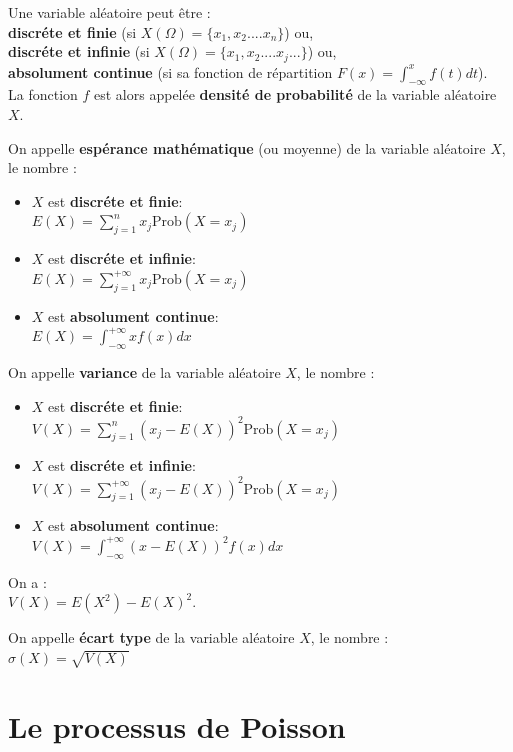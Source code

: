 \documentclass[a4paper,11pt]{book}
\begin{document}
Une variable al\'eatoire peut \^etre :\\
{\bf  discr\'ete et finie} (si $X(\Omega)=\{x_1,x_2....x_n\}$) ou,\\
{\bf  discr\'ete et infinie} (si $X(\Omega)=\{x_1,x_2....x_j...\}$) ou,\\
 {\bf absolument continue} (si sa fonction de r\'epartition 
$F(x)=\int_{-\infty}^xf(t)dt$).\\ 
La fonction $f$ est
alors appel\'ee {\bf densit\'e de probabilit\'e} de la variable al\'eatoire $X$.

On appelle {\bf esp\'erance math\'ematique} (ou moyenne) de la variable 
al\'eatoire $X$, le nombre :
\begin{itemize}
\item $X$ est {\bf  discr\'ete et finie}:\\
$E(X)=\sum_{j=1}^nx_j\mbox{Prob}(X=x_j)$
\item $X$ est {\bf  discr\'ete et infinie}:\\
$E(X)=\sum_{j=1}^{+\infty}x_j\mbox{Prob}(X=x_j)$
\item $X$ est {\bf  absolument continue}:\\
$E(X)=\int_{-\infty}^{+\infty}xf(x)dx$
\end{itemize}


On appelle {\bf variance} de la variable al\'eatoire $X$, le nombre :
\begin{itemize}
\item $X$ est {\bf  discr\'ete et finie}:\\
$V(X)=\sum_{j=1}^n(x_j-E(X))^2\mbox{Prob}(X=x_j)$
\item $X$ est {\bf  discr\'ete et infinie}:\\
$V(X)=\sum_{j=1}^{+\infty}(x_j-E(X))^2\mbox{Prob}(X=x_j)$
\item $X$ est {\bf  absolument continue}:\\
$V(X)=\int_{-\infty}^{+\infty}(x-E(X))^2f(x)dx$
\end{itemize}
On a :\\
$V(X)=E(X^2)-E(X)^2$.

On appelle {\bf \'ecart type} de la variable al\'eatoire $X$, le nombre :\\
$\sigma(X)=\sqrt{V(X)}$
\section{Le processus de Poisson}
\end{document}
